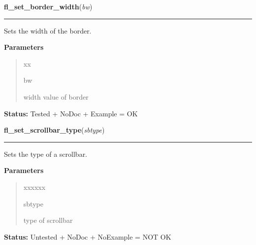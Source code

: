 \hspace{.8\funcindent}\begin{boxedminipage}{\funcwidth}

    \raggedright \textbf{fl\_set\_border\_width}(\textit{bw})

    \vspace{-1.5ex}

    \rule{\textwidth}{0.5\fboxrule}
\setlength{\parskip}{2ex}
    Sets the width of the border.

\setlength{\parskip}{1ex}
      \textbf{Parameters}
      \vspace{-1ex}

      \begin{quote}
        \begin{Ventry}{xx}

          \item[bw]

          width value of border

        \end{Ventry}

      \end{quote}

\textbf{Status:} Tested + NoDoc + Example = OK



    \end{boxedminipage}

    \label{xformslib:library:fl_set_scrollbar_type}

    \vspace{0.5ex}

\hspace{.8\funcindent}\begin{boxedminipage}{\funcwidth}

    \raggedright \textbf{fl\_set\_scrollbar\_type}(\textit{sbtype})

    \vspace{-1.5ex}

    \rule{\textwidth}{0.5\fboxrule}
\setlength{\parskip}{2ex}
    Sets the type of a scrollbar.

\setlength{\parskip}{1ex}
      \textbf{Parameters}
      \vspace{-1ex}

      \begin{quote}
        \begin{Ventry}{xxxxxx}

          \item[sbtype]

          type of scrollbar

        \end{Ventry}

      \end{quote}

\textbf{Status:} Untested + NoDoc + NoExample = NOT OK



    \end{boxedminipage}


